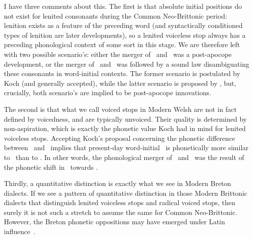 I have three comments about this. The first is that absolute initial positions do not exist for lenited consonants during the Common Neo-Brittonic period: lenition exists as a feature of the preceding word (and syntactically conditioned types of lenition are later developments), so a lenited voiceless stop always has a preceding phonological context of some sort in this stage.  We are therefore left with two possible scenario's: either the merger of \xD\ and \lT\ was a post-apocope development, or the merger of \xD\ and \lT\ was followed by a sound law disambiguating these consonants in word-initial contexts. The former scenario is postulated by Koch (and generally accepted), while the latter scenario is proposed by \textcite{harvey_aspects_1984}, but, crucially, both scenario's are implied to be post-apocope innovations.

The second is that what we call voiced stops in Modern Welsh are not in fact defined by voicedness, and are typically unvoiced. Their quality is determined by non-aspiration, which is exactly the phonetic value Koch had in mind for lenited voiceless stops. Accepting Koch's proposal concerning the phonetic difference between \lT\ and \xD\ implies that present-day word-initial \xD\ is phonetically more similar to \lT\ than to \xD. In other words, the phonological merger of \lT\ and \xD\ was the result of the phonetic shift in \xD\ towards \lT.

Thirdly, a quantitative distinction is exactly what we see in Modern Breton dialects. If we see a pattern of quantitative distinction in those Modern Brittonic dialects that distinguish lenited voiceless stops and radical voiced stops, then surely it is not such a stretch to assume the same for Common Neo-Brittonic. However, the Breton phonetic oppositions may have emerged under Latin influence~\autocite[31]{schrijver_old_2011}.
 



